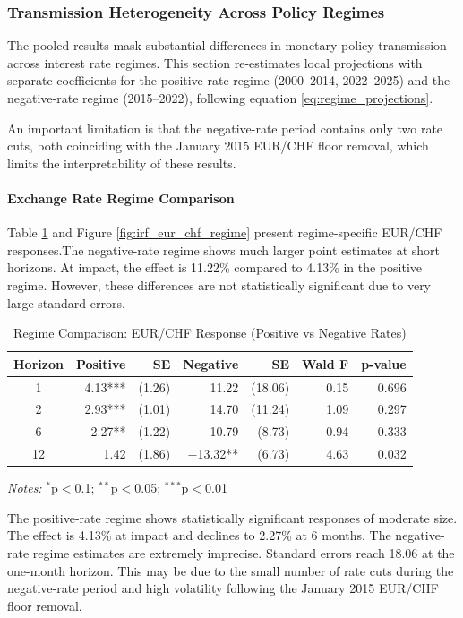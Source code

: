 \documentclass[12pt,a4paper]{article}
\begin{document}
\subsubsection{Transmission Heterogeneity Across Policy Regimes}
The pooled results mask substantial differences in monetary policy transmission across interest rate regimes. This section re-estimates local projections with separate coefficients for the positive-rate regime (2000--2014, 2022--2025) and the negative-rate regime (2015--2022), following equation \eqref{eq:regime_projections}. 

An important limitation is that the negative-rate period contains only two rate cuts, both coinciding with the January 2015 EUR/CHF floor removal, which limits the interpretability of these results.

\paragraph{Exchange Rate Regime Comparison}

Table \ref{tab:lp_fx_regime} and Figure \ref{fig:irf_eur_chf_regime} present regime-specific EUR/CHF responses.The negative-rate regime shows much larger point estimates at short horizons. At impact, the effect is 11.22\% compared to 4.13\% in the positive regime. However, these differences are not statistically significant due to very large standard errors.

\begin{table}[H]
	\centering
	\caption{Regime Comparison: EUR/CHF Response (Positive vs Negative Rates)} 
	\label{tab:lp_fx_regime}
	\begin{tabular}{crrrrrr}
		\toprule
		Horizon & Positive & SE & Negative & SE & Wald F & p-value \\ 
		\midrule
		1 & 4.13*** & (1.26) & 11.22 & (18.06) & 0.15 & 0.696 \\ 
		2 & 2.93*** & (1.01) & 14.70 & (11.24) & 1.09 & 0.297 \\ 
		6 & 2.27** & (1.22) & 10.79 & (8.73) & 0.94 & 0.333 \\ 
		12 & 1.42 & (1.86) & $-$13.32** & (6.73) & 4.63 & 0.032 \\ 
		\bottomrule
	\end{tabular}
	\vspace{0.2cm}
	
	{\footnotesize
		\textit{Notes:} $^{*}$p$<$0.1; $^{**}$p$<$0.05; $^{***}$p$<$0.01}
\end{table}

The positive-rate regime shows statistically significant responses of moderate size. The effect is 4.13\% at impact and declines to 2.27\% at 6 months. The negative-rate regime estimates are extremely imprecise. Standard errors reach 18.06 at the one-month horizon. This may be due to the small number of rate cuts during the negative-rate period and high volatility following the January 2015 EUR/CHF floor removal.
\end{document}
